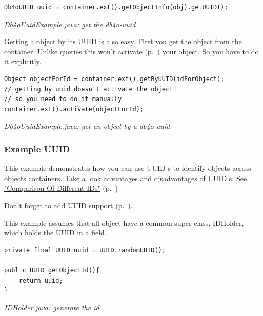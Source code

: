 \begin{lstlisting}
Db4oUUID uuid = container.ext().getObjectInfo(obj).getUUID();
\end{lstlisting}

{\small\itshape Db4oUuidExample.java: get the db4o-uuid\par}
\medskip

Getting a object by its UUID is also easy. First you get the object from the container. Unlike queries this won't \hyperref[ref:basics-activation]{activate} (p.~\pageref{ref:basics-activation}) your object. So you have to do it explicitly.

\begin{lstlisting}
Object objectForId = container.ext().getByUUID(idForObject);
// getting by uuid doesn't activate the object
// so you need to do it manually
container.ext().activate(objectForId);
\end{lstlisting}

{\small\itshape Db4oUuidExample.java: get an object by a db4o-uuid\par}
\medskip

\subsubsection{Example UUID}
\label{ref:platform-specific-issues-disconnected-objects-example-plattform-uuid}

This example demonstrates how you can use UUID s to identify objects across objects containers. Take a look advantages and disadvantages of UUID s: \hyperref[ref:platform-specific-issues-disconnected-objects-comparison-of-ids]{See "Comparison Of Different IDs"} (p.~\pageref{ref:platform-specific-issues-disconnected-objects-comparison-of-ids})

Don't forget to add \hyperref[ref:advanced-topics-type-handling-uuid-support]{UUID support} (p.~\pageref{ref:advanced-topics-type-handling-uuid-support}).

This example assumes that all object have a common super class, IDHolder, which holds the UUID in a field.

\begin{lstlisting}
private final UUID uuid = UUID.randomUUID();

public UUID getObjectId(){
    return uuid;
}
\end{lstlisting}

{\small\itshape IDHolder.java: generate the id\par}
\medskip

